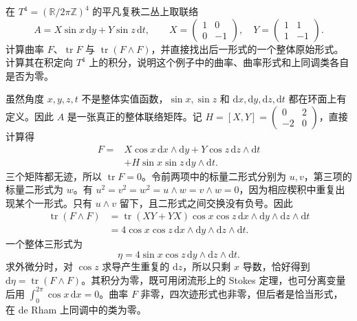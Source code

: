 \begin{exercise}\label{g2:ex:torus-nonflat-exact-curvature-square}
	在 \(T^4=(\mathbb R/2\pi\mathbb Z)^4\) 的平凡复秩二丛上取联络
	\[
		A=X\sin x\,\mathrm dy+Y\sin z\,\mathrm dt,\qquad
		X=\begin{pmatrix}1&0\\0&-1\end{pmatrix},\quad
		Y=\begin{pmatrix}1&1\\1&-1\end{pmatrix}.
	\]
	计算曲率 \(F\)、\(\operatorname{tr}F\) 与 \(\operatorname{tr}(F\wedge F)\)，并直接找出后一形式的一个整体原始形式。计算其在积定向 \(T^4\) 上的积分，说明这个例子中的曲率、曲率形式和上同调类各自是否为零。
\end{exercise}
\begin{solution}
	虽然角度 \(x,y,z,t\) 不是整体实值函数，\(\sin x,\sin z\) 和 \(\mathrm dx,\mathrm dy,\mathrm dz,\mathrm dt\) 都在环面上有定义。因此 \(A\) 是一张真正的整体联络矩阵。记 \(H=[X,Y]=\begin{pmatrix}0&2\\-2&0\end{pmatrix}\)，直接计算得
	\[
	\begin{aligned}
		F={}&X\cos x\,\mathrm dx\wedge\mathrm dy
		+Y\cos z\,\mathrm dz\wedge\mathrm dt\\
		&+H\sin x\sin z\,\mathrm dy\wedge\mathrm dt.
	\end{aligned}
	\]
	三个矩阵都无迹，所以 \(\operatorname{tr}F=0\)。令前两项中的标量二形式分别为 \(u,v\)，第三项的标量二形式为 \(w\)。有 \(u^2=v^2=w^2=u\wedge w=v\wedge w=0\)，因为相应楔积中重复出现某个一形式。只有 \(u\wedge v\) 留下，且二形式之间交换没有负号。因此
	\[
	\begin{aligned}
		\operatorname{tr}(F\wedge F)
		&=\operatorname{tr}(XY+YX)\cos x\cos z\,
		\mathrm dx\wedge\mathrm dy\wedge\mathrm dz\wedge\mathrm dt\\
		&=4\cos x\cos z\,
		\mathrm dx\wedge\mathrm dy\wedge\mathrm dz\wedge\mathrm dt.
	\end{aligned}
	\]
	一个整体三形式为
	\[
		\eta=4\sin x\cos z\,\mathrm dy\wedge\mathrm dz\wedge\mathrm dt.
	\]
	求外微分时，对 \(\cos z\) 求导产生重复的 \(\mathrm dz\)，所以只剩 \(x\) 导数，恰好得到 \(\mathrm d\eta=\operatorname{tr}(F\wedge F)\)。其积分为零，既可用闭流形上的 Stokes 定理，也可分离变量后用 \(\int_0^{2\pi}\cos x\,\mathrm dx=0\)。曲率 \(F\) 非零，四次迹形式也非零，但后者是恰当形式，在 de Rham 上同调中的类为零。
\end{solution}

